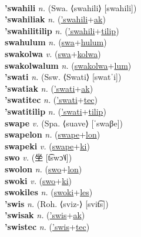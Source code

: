  \label{'swanatilip} \\
\textbf{'swahili} \textit{n.} (Swa. ⟨swahili⟩ [swahili])
 \label{'swahili} \\
\textbf{'swahiliak} \textit{n.} (\hyperref['swahili]{'swahili}+\hyperref[ak]{ak})
 \label{'swahiliak} \\
\textbf{'swahilitilip} \textit{n.} (\hyperref['swahili]{'swahili}+\hyperref[tilip]{tilip})
 \label{'swahilitilip} \\
\textbf{swahulum} \textit{n.} (\hyperref[swa]{swa}+\hyperref[hulum]{hulum})
 \label{swahulum} \\
\textbf{swakolwa} \textit{v.} (\hyperref[swa]{swa}+\hyperref[kolwa]{kolwa})
 \label{swakolwa} \\
\textbf{swakolwalum} \textit{n.} (\hyperref[swakolwa]{swakolwa}+\hyperref[lum]{lum})
 \label{swakolwalum} \\
\textbf{'swati} \textit{n.} (Ssw. ⟨Swati⟩ [swatˈi])
 \label{'swati} \\
\textbf{'swatiak} \textit{n.} (\hyperref['swati]{'swati}+\hyperref[ak]{ak})
 \label{'swatiak} \\
\textbf{'swatitec} \textit{n.} (\hyperref['swati]{'swati}+\hyperref[tec]{tec})
 \label{'swatitec} \\
\textbf{'swatitilip} \textit{n.} (\hyperref['swati]{'swati}+\hyperref[tilip]{tilip})
 \label{'swatitilip} \\
\textbf{swape} \textit{v.} (Spa. ⟨suave⟩ [ˈswaβe])
 \label{swape} \\
\textbf{swapelon} \textit{n.} (\hyperref[swape]{swape}+\hyperref[lon]{lon})
 \label{swapelon} \\
\textbf{swapeki} \textit{v.} (\hyperref[swape]{swape}+\hyperref[ki]{ki})
 \label{swapeki} \\
\textbf{swo} \textit{v.} ({\chinese{}坐} [t͡swɔ˥˩])
 \label{swo} \\
\textbf{swolon} \textit{n.} (\hyperref[swo]{swo}+\hyperref[lon]{lon})
 \label{swolon} \\
\textbf{swoki} \textit{v.} (\hyperref[swo]{swo}+\hyperref[ki]{ki})
 \label{swoki} \\
\textbf{swokiles} \textit{n.} (\hyperref[swoki]{swoki}+\hyperref[les]{les})
 \label{swokiles} \\
\textbf{'swis} \textit{n.} (Roh. ⟨sviz-⟩ [svit͡s])
 \label{'swis} \\
\textbf{'swisak} \textit{n.} (\hyperref['swis]{'swis}+\hyperref[ak]{ak})
 \label{'swisak} \\
\textbf{'swistec} \textit{n.} (\hyperref['swis]{'swis}+\hyperref[tec]{tec})
 \label{'swistec} 

